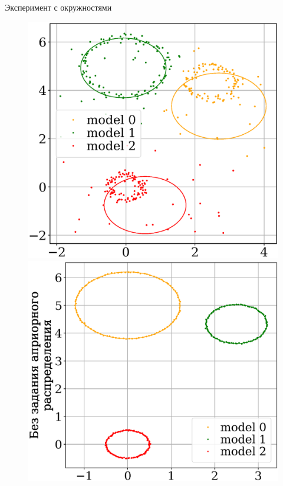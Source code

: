 \documentclass[10pt,pdf,hyperref={unicode}]{beamer}
\begin{document}
\begin{frame}{Эксперимент с окружностями}
\begin{figure}[h!]
\begin{minipage}{.32\textwidth}
\vspace{-3mm}
\hspace{-8.5mm}
      \includegraphics[width =  1.07\textwidth]{figures/902.eps}
\end{minipage}
\begin{minipage}{.32\textwidth}
      \includegraphics[width =  \textwidth]{figures/900.eps}

\end{minipage}
\end{figure}
\end{frame}
\end{document}
